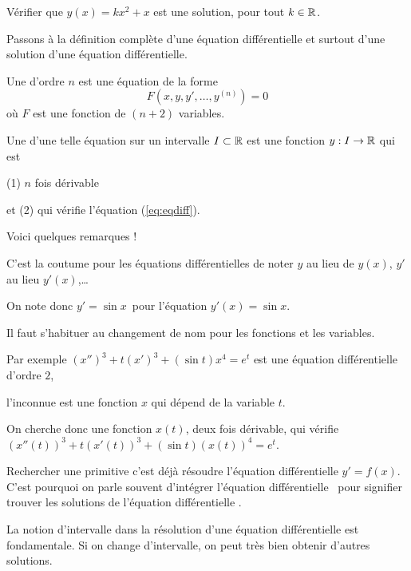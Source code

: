 \change
Vérifier que $y(x)=kx^2+x$ est une solution, pour tout $k \in \mathbb{R}$.


\diapo



Passons à la définition complète d'une équation différentielle
et surtout d'une solution d'une équation différentielle.


Une  d'ordre $n$ est une équation de la forme
  \begin{equation}
    F\left(x,y,y',\dots ,y^{(n)}\right)=0 
    \label{eq:eqdiff}
    \tag{$E$}
  \end{equation}
  où $F$ est une fonction de $(n+2)$ variables.
  
 \change 
  
Une  d'une telle équation sur un intervalle $I\subset \mathbb{R}$ 
  est une fonction $y :I \to \mathbb{R}$ qui est 
  
  (1) $n$ fois dérivable 
  
  et (2) qui vérifie l'équation (\ref{eq:eqdiff}).
  

\diapo

Voici quelques remarques !


C'est la coutume pour les équations différentielles de noter $y$ 
au lieu de $y(x)$, 
  $y'$ au lieu $y'(x)$,\ldots
  
  
\change
On note donc \og$y' = \sin x$\fg\ pour l'équation \og$y'(x) = \sin x$\fg.
  
\change
Il faut s'habituer au changement de nom pour les fonctions et les variables.

\change
  Par exemple $(x'')^3+t(x')^3+(\sin t) x^4=e^t$
  est une équation différentielle d'ordre $2$, 
  
  l'inconnue est une fonction $x$ qui dépend de la variable $t$.
  
  On cherche donc une fonction $x(t)$,
  deux fois dérivable, qui vérifie $(x''(t))^3+t(x'(t))^3+(\sin t) (x(t))^4=e^t$. 

\change

Rechercher une primitive c'est déjà résoudre l'équation différentielle
  $y'= f(x)$. C'est pourquoi on parle souvent \og d'intégrer l'équation différentielle \fg\ 
  pour signifier \og trouver les solutions de l'équation différentielle \fg.
  
 
\change
La notion d'intervalle dans la résolution d'une équation différentielle est fondamentale. 
  Si on change d'intervalle, on peut très bien obtenir d'autres solutions. 

